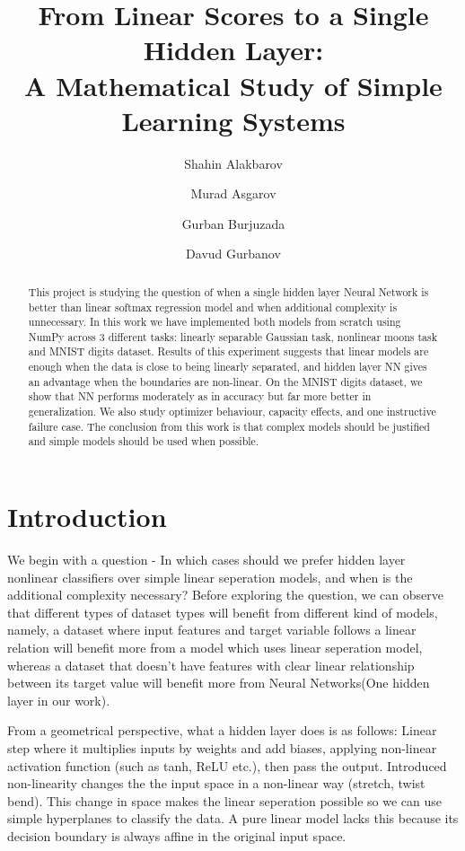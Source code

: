 \documentclass[11pt]{article}
\title{From Linear Scores to a Single Hidden Layer:\\
A Mathematical Study of Simple Learning Systems}
\author{Shahin Alakbarov \and Murad Asgarov \and Gurban Burjuzada \and Davud Gurbanov}
\date{}
\begin{document}
\maketitle

\begin{abstract}
This project is studying the question of when a single hidden layer Neural Network is better than linear softmax regression model and when additional complexity is unnecessary. In this work we have implemented both models from scratch using NumPy across 3 different tasks: linearly separable Gaussian task, nonlinear moons task and MNIST digits dataset. Results of this experiment suggests that linear models are enough when the data is close to being linearly separated, and hidden layer NN gives an advantage when the boundaries are non-linear. On the MNIST digits dataset, we show that NN performs moderately as in accuracy but far more better in generalization. We also
study optimizer behaviour, capacity effects, and one instructive failure case.
The conclusion from this work is that complex models should be justified and simple models should be used when possible.
\end{abstract}

\section{Introduction}

We begin with a question - In which cases should we prefer hidden layer nonlinear classifiers over simple linear seperation models, and when is the additional complexity necessary?
Before exploring the question, we can observe that different types of dataset types will benefit from different kind of models, namely, a dataset where input features and target variable follows a linear relation will benefit more from a model which uses linear seperation model, whereas a dataset that doesn't have features with clear linear relationship between its target value will benefit more from Neural Networks(One hidden layer in our work).

From a geometrical perspective, what a hidden layer does is as follows: Linear step where it multiplies inputs by weights and add biases, applying non-linear activation function (such as tanh, ReLU etc.), then pass the output. Introduced non-linearity changes the the input space in a non-linear way (stretch, twist bend). This change in space makes the linear seperation possible so we can use simple hyperplanes to classify the data. A pure linear model lacks this because its decision boundary is always affine in the original input space.
\end{document}
